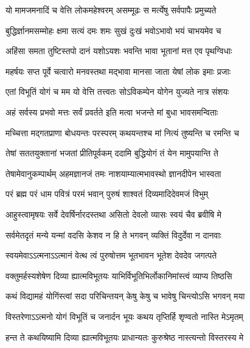 \twolineshloka
{यो मामजमनादिं च वेत्ति लोकमहेश्वरम्}
{असम्मूढः स मर्त्येषु सर्वपापैः प्रमुच्यते}%

\twolineshloka
{बुद्धिर्ज्ञानमसम्मोहः क्षमा सत्यं दमः शमः}
{सुखं दुःखं भवोऽभावो भयं चाभयमेव च}%

\twolineshloka
{अहिंसा समता तुष्टिस्तपो दानं यशोऽयशः}
{भवन्ति भावा भूतानां मत्त एव पृथग्विधाः}%

\twolineshloka
{महर्षयः सप्त पूर्वे चत्वारो मनवस्तथा}
{मद्भावा मानसा जाता येषां लोक इमाः प्रजाः}%

\twolineshloka
{एतां विभूतिं योगं च मम यो वेत्ति तत्त्वतः}
{सोऽविकम्पेन योगेन युज्यते नात्र संशयः}%

\twolineshloka
{अहं सर्वस्य प्रभवो मत्तः सर्वं प्रवर्तते}
{इति मत्वा भजन्ते मां बुधा भावसमन्विताः}%

\twolineshloka
{मच्चित्ता मद्गतप्राणा बोधयन्तः परस्परम्}
{कथयन्तश्च मां नित्यं तुष्यन्ति च रमन्ति च}%

\twolineshloka
{तेषां सततयुक्तानां भजतां प्रीतिपूर्वकम्}
{ददामि बुद्धियोगं तं येन मामुपयान्ति ते}%

\twolineshloka
{तेषामेवानुकम्पार्थम् अहमज्ञानजं तमः}
{नाशयाम्यात्मभावस्थो ज्ञानदीपेन भास्वता}%


\twolineshloka
{परं ब्रह्म परं धाम पवित्रं परमं भवान्}
{पुरुषं शाश्वतं दिव्यमादिदेवमजं विभुम्}%

\twolineshloka
{आहुस्त्वामृषयः सर्वे देवर्षिर्नारदस्तथा}
{असितो देवलो व्यासः स्वयं चैव ब्रवीषि मे}%

\twolineshloka
{सर्वमेतदृतं मन्ये यन्मां वदसि केशव}
{न हि ते भगवन् व्यक्तिं विदुर्देवा न दानवाः}%

\twolineshloka
{स्वयमेवाऽऽत्मनाऽऽत्मानं वेत्थ त्वं पुरुषोत्तम}
{भूतभावन भूतेश देवदेव जगत्पते}%

\twolineshloka
{वक्तुमर्हस्यशेषेण दिव्या ह्यात्मविभूतयः}
{याभिर्विभूतिभिर्लोकानिमांस्त्वं व्याप्य तिष्ठसि}%

\twolineshloka
{कथं विद्यामहं योगिंस्त्वां सदा परिचिन्तयन्}
{केषु केषु च भावेषु चिन्त्योऽसि भगवन् मया}%

\twolineshloka
{विस्तरेणाऽऽत्मनो योगं विभूतिं च जनार्दन}
{भूयः कथय तृप्तिर्हि शृण्वतो नास्ति मेऽमृतम्}%


\twolineshloka
{हन्त ते कथयिष्यामि दिव्या ह्यात्मविभूतयः}
{प्राधान्यतः कुरुश्रेष्ठ नास्त्यन्तो विस्तरस्य मे}%


